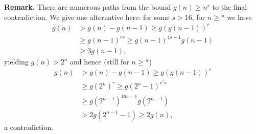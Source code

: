 \documentclass[amssymb,twocolumn,pra,10pt,aps]{revtex4-1}
\begin{document}
\begin{itemize}
\noindent
\textbf{Remark.}
There are numerous paths from the bound $g(n) \geq n^s$ to the final contradiction.
We give one alternative here: for some $s > 16$, for $n \geq *$ we have
\begin{align*}
g(n) &> g(n) - g(n-1) \geq g(g(n-1))^r \\
&\geq g(n-1)^{rs} \geq g(n-1)^{4s-1} g(n-1) \\
&\geq 3 g(n-1),
\end{align*}
yielding $g(n) > 2^n$ and hence (still for $n \geq *$)
\begin{align*}
g(n) &> g(n)-g(n-1) \geq g(g(n-1))^r \\
&\geq g(2^n)^r \geq g(2^n-1)^{r^2s} \\
&\geq g(2^{n-1})^{16s-1} g(2^{n-1}) \\
&> 2g(2^{n-1}-1) \geq 2g(n),
\end{align*}
a contradiction.


\end{itemize}
\end{document}
